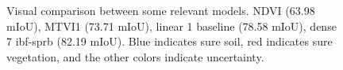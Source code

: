 \documentclass[../thesis.tex]{subfiles}
\begin{document}
\begin{figure}[H]
		 \hspace{-1em}
		 \hspace{-1em}
	
		\caption{Visual comparison between some relevant models. NDVI (63.98 mIoU), MTVI1 (73.71 mIoU), linear 1 baseline (78.58 mIoU), dense 7 ibf-sprb (82.19 mIoU). 
		Blue indicates sure soil, red indicates sure vegetation, and the other colors indicate uncertainty.}
	\label{fig:visual-comparison}
	\end{figure}
    \vfill
\end{document}
